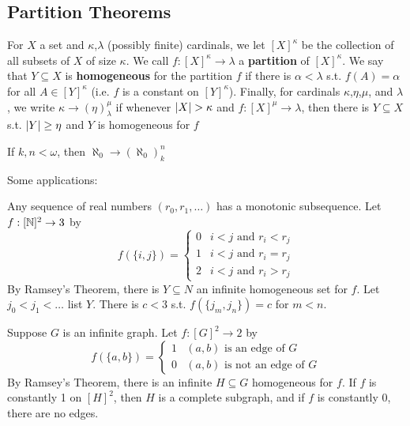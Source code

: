 \documentclass[11pt]{article}
\begin{document}
\subsection{Partition Theorems}
\label{sec:orgefc76eb}
For \(X\) a set and \(\kappa\),\(\lambda\) (possibly finite) cardinals, we let \([X]^\kappa\) be the collection of all
subsets of \(X\) of size \(\kappa\). We call \(f:[X]^\kappa\to\lambda\) a \textbf{partition} of \([X]^\kappa\). We say
that \(Y\subseteq X\) is \textbf{homogeneous} for the partition \(f\) if there is \(\alpha<\lambda\) s.t. \(f(A)=\alpha\) for
all \(A\in[Y]^\kappa\) (i.e. \(f\) is a constant on \([Y]^\kappa\)). Finally, for cardinals \(\kappa\),\(\eta\),\(\mu\), and \(\lambda\), we
write \(\kappa\to(\eta)_\lambda^\mu\) if whenever \(\abs{X}>\kappa\) and \(f:[X]^\mu\to\lambda\), then there is \(Y\subseteq X\)
s.t. \(\abs{Y}\ge\eta\) and \(Y\) is homogeneous for \(f\)

\begin{theorem}
If \(k,n<\omega\), then \(\aleph_0\to(\aleph_0)^n_k\)
\end{theorem}

Some applications:

Any sequence of real numbers \((r_0,r_1,\dots)\) has a monotonic subsequence. Let \(f:[\mathbb{N}]^2\to 3\) by
\begin{equation*}
f(\{i,j\})=
\begin{cases}
0&i<j\text{ and }r_i<r_j\\
1&i<j\text{ and }r_i=r_j\\
2&i<j\text{ and }r_i>r_j
\end{cases}
\end{equation*}
By Ramsey's Theorem, there is \(Y\subseteq N\) an infinite homogeneous set for \(f\). Let \(j_0<j_1<\dots\)
list \(Y\). There is \(c<3\) s.t. \(f(\{j_m,j_n\})=c\) for \(m<n\).

Suppose \(G\) is an infinite graph. Let \(f:[G]^2\to 2\) by
\begin{equation*}
f(\{a,b\})=
\begin{cases}
1&(a,b)\text{ is an edge of }G\\
0&(a,b)\text{ is not an edge of }G
\end{cases}
\end{equation*}
By Ramsey's Theorem, there is an infinite \(H\subseteq G\) homogeneous for \(f\). If \(f\) is constantly
1 on \([H]^2\), then \(H\) is a complete subgraph, and if \(f\) is constantly 0, there are no
edges.
\end{document}
